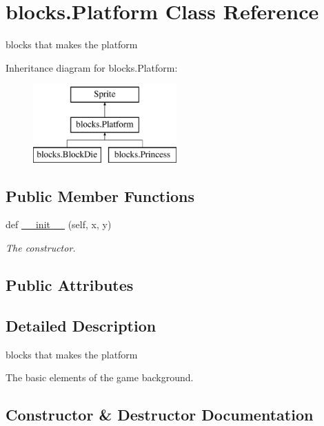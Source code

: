 \hypertarget{classblocks_1_1_platform}{}\section{blocks.\+Platform Class Reference}
\label{classblocks_1_1_platform}


blocks that makes the platform  


Inheritance diagram for blocks.\+Platform\+:\begin{figure}[H]
\begin{center}
\leavevmode
\includegraphics[height=3.000000cm]{classblocks_1_1_platform}
\end{center}
\end{figure}
\subsection*{Public Member Functions}
\begin{DoxyCompactItemize}
\item 
def \hyperlink{classblocks_1_1_platform_a8c0aa810b5e8c4551852e640d99d5c00}{\+\_\+\+\_\+init\+\_\+\+\_\+} (self, x, y)
\begin{DoxyCompactList}\small\item\em The constructor. \end{DoxyCompactList}\end{DoxyCompactItemize}
\subsection*{Public Attributes}
\begin{DoxyCompactItemize}
\end{DoxyCompactItemize}


\subsection{Detailed Description}
blocks that makes the platform 

The basic elements of the game background. 

\subsection{Constructor \& Destructor Documentation}
